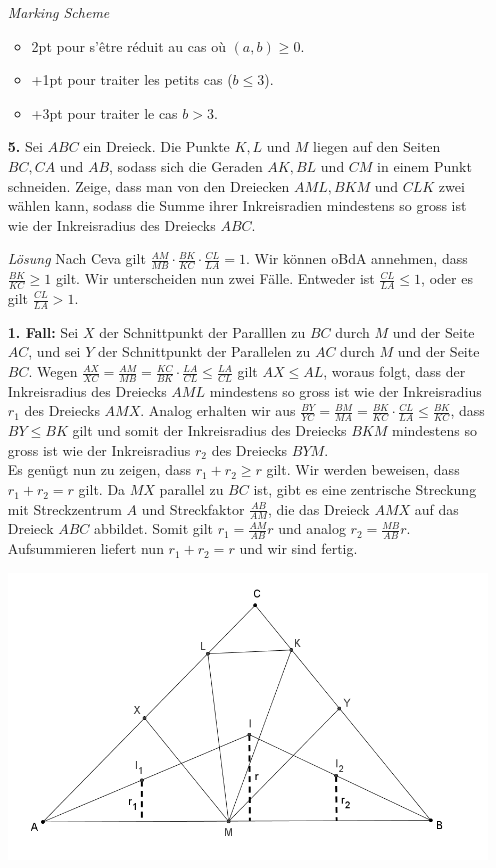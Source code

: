 \documentclass[language=german,style=solution]{smo}
\begin{document}
\begin{enumerate}
\textit{Marking Scheme}
\begin{itemize}
\item 2pt pour s'être réduit au cas où  $(a,b)\geq 0$.
\item +1pt pour traiter les petits cas ($b\leq 3$).
\item +3pt pour traiter le cas $b>3$.
\end{itemize}

\newpage

\item[\textbf{5.}] %
Sei $ABC$ ein Dreieck. Die Punkte $K, L$ und $M$ liegen auf den Seiten $BC, CA$ und $AB$, sodass sich die Geraden $AK, BL$ und $CM$ in einem Punkt schneiden. Zeige, dass man von den Dreiecken $AML, BKM$ und $CLK$ zwei wählen kann, sodass die Summe ihrer Inkreisradien mindestens so gross ist wie der Inkreisradius des Dreiecks $ABC$.

\textit{Lösung}
Nach Ceva gilt $\frac{AM}{MB}\cdot\frac{BK}{KC}\cdot\frac{CL}{LA}=1$. Wir können oBdA annehmen, dass $\frac{BK}{KC}\geq 1$ gilt. Wir unterscheiden nun zwei Fälle. Entweder ist $\frac{CL}{LA}\leq 1$, oder es gilt $\frac{CL}{LA}>1$.

\textbf{1. Fall:} Sei $X$ der Schnittpunkt der Paralllen zu $BC$ durch $M$ und der Seite $AC$, und sei $Y$ der Schnittpunkt der Parallelen zu $AC$ durch $M$ und der Seite $BC$. Wegen $\frac{AX}{XC}=\frac{AM}{MB}=\frac{KC}{BK}\cdot\frac{LA}{CL}\leq \frac{LA}{CL}$ gilt $AX\leq AL$, woraus folgt, dass der Inkreisradius des Dreiecks $AML$ mindestens so gross ist wie der Inkreisradius $r_1$ des Dreiecks $AMX$. Analog erhalten wir aus $\frac{BY}{YC}=\frac{BM}{MA}=\frac{BK}{KC}\cdot\frac{CL}{LA}\leq \frac{BK}{KC}$, dass $BY\leq BK$ gilt und somit der Inkreisradius des Dreiecks $BKM$ mindestens so gross ist wie der Inkreisradius $r_2$ des Dreiecks $BYM$.\\
Es genügt nun zu zeigen, dass $r_1+r_2\geq r$ gilt. Wir werden beweisen, dass $r_1+r_2=r$ gilt. Da $MX$ parallel zu $BC$ ist, gibt es eine zentrische Streckung mit Streckzentrum $A$ und Streckfaktor $\frac{AB}{AM}$, die das Dreieck $AMX$ auf das Dreieck $ABC$ abbildet. Somit gilt $r_1=\frac{AM}{AB}r$ und analog $r_2=\frac{MB}{AB}r$. Aufsummieren liefert nun $r_1+r_2=r$ und wir sind fertig.

\includegraphics[width=\textwidth]{Muloe5}


\end{enumerate}
\end{document}
